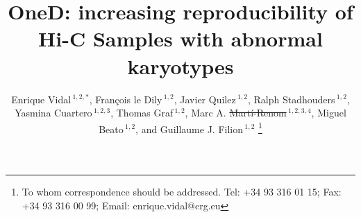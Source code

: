 \documentclass[a4,center,fleqn]{NAR}
\providecommand{\DIFadd}[1]{{\protect\color{blue}\uwave{#1}}} %
\providecommand{\DIFdel}[1]{{\protect\color{red}\sout{#1}}}                      %
\providecommand{\DIFaddbegin}{} %
\providecommand{\DIFaddend}{} %
\providecommand{\DIFdelbegin}{} %
\providecommand{\DIFdelend}{} %
\begin{document}
\title{OneD: increasing reproducibility of Hi-C Samples with abnormal
karyotypes}

\author{%
Enrique Vidal\,$^{1,2,*}$,
Fran\c{c}ois le Dily\,$^{1,2}$,
Javier Quilez\,$^{1,2}$,
Ralph Stadhouders\,$^{1,2}$,
Yasmina Cuartero\,$^{1,2,3}$,
Thomas Graf\,$^{1,2}$,
Marc A.  \DIFdelbegin \DIFdel{Mart\'i-Renom}\DIFdelend \DIFaddbegin \DIFadd{Marti-Renom}\DIFaddend \,$^{1,2,3,4}$,
Miguel Beato\,$^{1,2}$,
and Guillaume J. Filion\,$^{1,2}$%
\footnote{To whom correspondence should be addressed.
Tel: +34 93 316 01 15; Fax: +34 93 316 00 99; Email: enrique.vidal@crg.eu}}

\DIFdelbegin %
\DIFdelend \DIFaddbegin \address{%
$^{1}$Gene Regulation, Stem Cells and Cancer Program, Centre for
Genomic Regulation (CRG), The Barcelona Institute of Science and
Technology (BIST), Dr. Aiguader 88, 08003, Barcelona, Spain
and
$^{2}$Universitat Pompeu Fabra (UPF), Barcelona, Spain
and
$^{3}$CNAG-CRG, Centre for Genomic Regulation (CRG), Barcelona
Institute of Science and Technology (BIST), Baldiri i Reixac 4, 08028
Barcelona, Spain
and
$^{4}$ICREA, Pg. Llu\'is Companys 23, 08010 Barcelona, Spain}
\DIFaddend 



\maketitle
\end{document}
